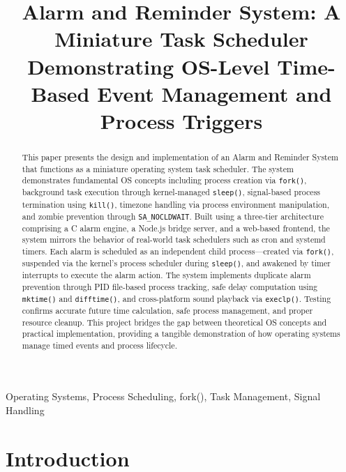 \documentclass[conference]{IEEEtran}
\begin{document}
\title{Alarm and Reminder System: A Miniature Task Scheduler Demonstrating OS-Level Time-Based Event Management and Process Triggers}

\author{
}

\maketitle

\begin{abstract}
This paper presents the design and implementation of an Alarm and Reminder System that functions as a miniature operating system task scheduler. The system demonstrates fundamental OS concepts including process creation via \texttt{fork()}, background task execution through kernel-managed \texttt{sleep()}, signal-based process termination using \texttt{kill()}, timezone handling via process environment manipulation, and zombie prevention through \texttt{SA\_NOCLDWAIT}. Built using a three-tier architecture comprising a C alarm engine, a Node.js bridge server, and a web-based frontend, the system mirrors the behavior of real-world task schedulers such as cron and systemd timers. Each alarm is scheduled as an independent child process---created via \texttt{fork()}, suspended via the kernel's process scheduler during \texttt{sleep()}, and awakened by timer interrupts to execute the alarm action. The system implements duplicate alarm prevention through PID file-based process tracking, safe delay computation using \texttt{mktime()} and \texttt{difftime()}, and cross-platform sound playback via \texttt{execlp()}. Testing confirms accurate future time calculation, safe process management, and proper resource cleanup. This project bridges the gap between theoretical OS concepts and practical implementation, providing a tangible demonstration of how operating systems manage timed events and process lifecycle.
\end{abstract}

\begin{IEEEkeywords}
Operating Systems, Process Scheduling, fork(), Task Management, Signal Handling
\end{IEEEkeywords}

\section{Introduction}
\end{document}
